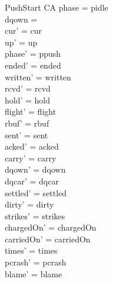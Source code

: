 \documentclass[a4paper,10pt,fleqn]{article}
\begin{document}
\begin{schema}{PushStart}
  \Delta CA
\where
  phase = pidle \\
  dqown = \emptyset \\
  cur' = cur \\
  up' = up \\
  phase' = ppush \\
  ended' = ended \\
  written' = written \\
  rcvd' = rcvd \\
  hold' = hold \\
  flight' = flight \\
  rbuf' = rbuf \\
  sent' = sent \\
  acked' = acked \\
  carry' = carry \\
  dqown' = dqown \\
  dqcar' = dqcar \\
  settled' = settled \\
  dirty' = dirty \\
  strikes' = strikes \\
  chargedOn' = chargedOn \\
  carriedOn' = carriedOn \\
  times' = times \\
  pcrash' = pcrash \\
  blame' = blame
\end{schema}
\end{document}
